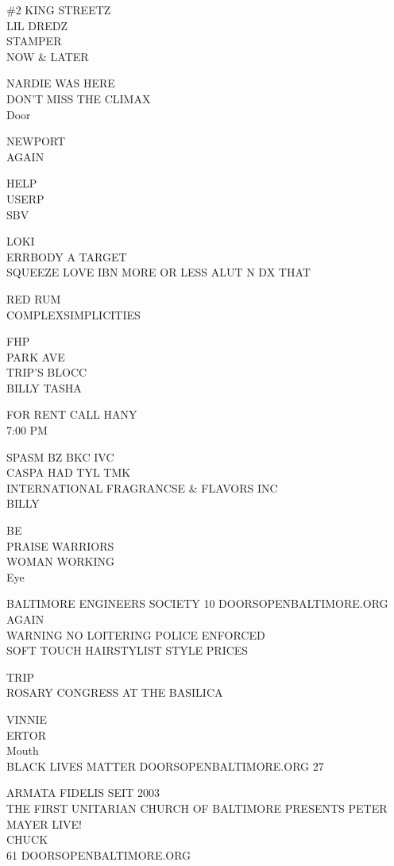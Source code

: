 \documentclass[10pt,letterpaper]{article}
\begin{document}
\#2 KING STREETZ\\
LIL DREDZ\\
STAMPER\\
NOW \& LATER

NARDIE WAS HERE\\
DON'T MISS THE CLIMAX\\
Door

NEWPORT\\
AGAIN

HELP\\
USERP\\
SBV

LOKI\\
ERRBODY A TARGET\\
SQUEEZE LOVE IBN MORE OR LESS ALUT N DX THAT

RED RUM\\
COMPLEXSIMPLICITIES

FHP\\
PARK AVE\\
TRIP'S BLOCC\\
BILLY TASHA

FOR RENT CALL HANY\\
7:00 PM

SPASM BZ BKC IVC\\
CASPA HAD TYL TMK\\
INTERNATIONAL FRAGRANCSE \& FLAVORS INC\\
BILLY

BE\\
PRAISE WARRIORS\\
WOMAN WORKING\\
Eye

BALTIMORE ENGINEERS SOCIETY 10 DOORSOPENBALTIMORE.ORG\\
AGAIN\\
WARNING NO LOITERING POLICE ENFORCED\\
SOFT TOUCH HAIRSTYLIST STYLE PRICES

TRIP\\
ROSARY CONGRESS AT THE BASILICA

VINNIE\\
ERTOR\\
Mouth\\
BLACK LIVES MATTER DOORSOPENBALTIMORE.ORG 27

ARMATA FIDELIS SEIT 2003\\
THE FIRST UNITARIAN CHURCH OF BALTIMORE PRESENTS PETER MAYER LIVE!\\
CHUCK\\
61 DOORSOPENBALTIMORE.ORG
\end{document}
